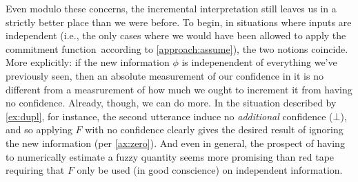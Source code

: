 \documentclass{article}
\def\cofunc{commitment function}
\begin{document}
\begin{enumerate}[label={\textbf{I\arabic*.}},ref={I\arabic*}]
	Even modulo these concerns, the incremental interpretation still leaves us in a strictly better place than we were before.
	To begin, in situations where inputs are independent (i.e., the only cases where we would have been allowed to apply the \cofunc\ according to \cref{approach:assume}), the two notions coincide. 
	More explicitly: if the new information $\phi$ is indepenendent of everything we've previously seen, then an absolute measurement of our confidence in it is no different from a measrurement of how much we ought to increment it from having no confidence.
	Already, though, we can do more.
	In the situation described by \cref{ex:dupl}, for instance, 
	the second utterance induce no \emph{additional} confidence ($\bot$), and so applying $F$ with no confidence clearly gives the desired result of ignoring the new information (per \cref{ax:zero}). 
%
%
	And even in general, the prospect of having to numerically estimate a fuzzy quantity seems more promising than red tape requiring that $F$ only be used (in good conscience) on independent information.	

\end{enumerate}


\end{document}

